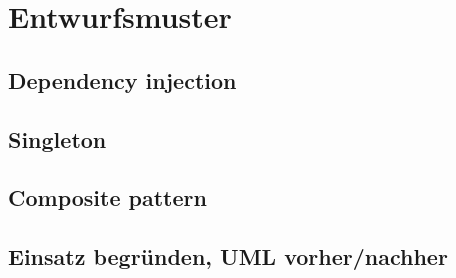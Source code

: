 \chapter{Entwurfsmuster}


\section{Dependency injection}

\section{Singleton}

\section{Composite pattern}

\section{Einsatz begründen, UML vorher/nachher}